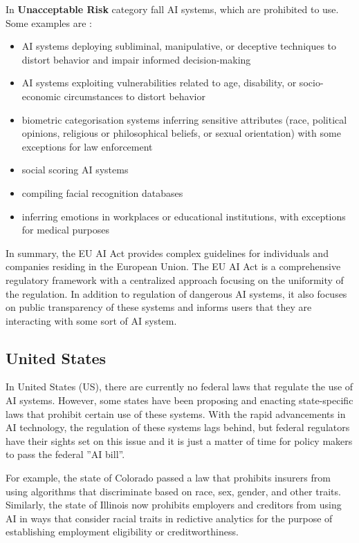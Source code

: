In \textbf{Unacceptable Risk} category fall AI systems, which are prohibited to use. Some examples are \cite{eu_ai_act_summary}:
\begin{itemize}
    \item AI systems deploying subliminal, manipulative, or deceptive techniques to distort behavior and impair informed decision-making
    \item AI systems exploiting vulnerabilities related to age, disability, or socio-economic circumstances to distort behavior
    \item biometric categorisation systems inferring sensitive attributes (race, political opinions, religious or philosophical beliefs, or sexual orientation) with some exceptions for law enforcement
    \item social scoring AI systems
    \item compiling facial recognition databases
    \item inferring emotions in workplaces or educational institutions, with exceptions for medical purposes
\end{itemize}

In summary, the EU AI Act provides complex guidelines for individuals and companies residing in the European Union. The EU AI Act is a comprehensive regulatory framework with a centralized approach focusing on the uniformity of the regulation. In addition to regulation of dangerous AI systems, it also focuses on public transparency of these systems and informs users that they are interacting with some sort of AI system.


\subsection{United States}
In United States (US), there are currently no federal laws that regulate the use of AI systems. However, some states have been proposing and enacting state-specific laws that prohibit certain use of these systems. With the rapid advancements in AI technology, the regulation of these systems lags behind, but federal regulators have their sights set on this issue and it is just a matter of time for policy makers to pass the federal ''AI bill''.

For example, the state of Colorado passed a law that prohibits insurers from using algorithms that discriminate based on race, sex, gender, and other traits. Similarly, the state of Illinois now prohibits employers and creditors from using AI in ways that consider racial traits in redictive analytics for the purpose of establishing employment eligibility or creditworthiness\cite{Parinandi_Crosson_Peterson_Nadarevic_2024}.

